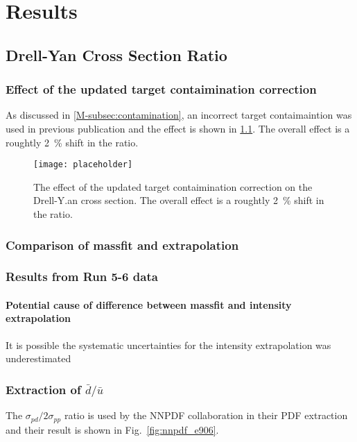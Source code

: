 \documentclass[../main.tex]{subfiles}
\begin{document}
\ifSubfilesClassLoaded{
	\mainmatter
	\setcounter{chapter}{5}
}{}

\chapter{Results}
\label{ch:result}
\section{Drell-Yan Cross Section Ratio}
\subsection{Effect of the updated target contaimination correction}
As discussed in \cref{M-subsec:contamination}, an incorrect target contaimaintion was used
in previous publication and the effect is shown in \cref{fig:contaimination_CSR}.  
The overall effect is a roughtly \SI{2}{\percent} shift in the ratio. 
\begin{figure}[h!]
	\centering
	\texttt{[image: placeholder]}
	\caption{The effect of the updated target contaimination correction on the Drell-Y.an 
		cross section. The overall effect is a roughtly \SI{2}{\percent} shift in the ratio. }
	\label{fig:contaimination_CSR}
\end{figure}

\subsection{Comparison of massfit and extrapolation}


\subsection{Results from Run 5-6 data}
\subsubsection{Potential cause of difference between massfit and intensity extrapolation}
It is possible the systematic uncertainties for the intensity extrapolation was
underestimated

\subsection{Extraction of \texorpdfstring{$\bar{d}/\bar{u}$}{dbar/ubar}}
The $\sigma_{pd}/2\sigma_{pp}$ ratio is used by the NNPDF collaboration in
their PDF extraction\cite{ball2021} and their result is shown in Fig.\
\ref{fig:nnpdf_e906}.
\end{document}
